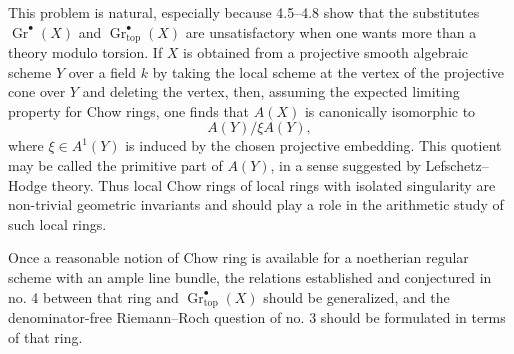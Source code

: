 \documentclass[12pt]{article}
\newcommand{\Gr}{\operatorname{Gr}}
\newcommand{\topf}{\mathrm{top}}
\begin{document}
This problem is natural, especially because 4.5--4.8 show that the substitutes $\Gr^\bullet(X)$ and $\Gr^\bullet_{\topf}(X)$ are unsatisfactory when one wants more than a theory modulo torsion. If $X$ is obtained from a projective smooth algebraic scheme $Y$ over a field $k$ by taking the local scheme at the vertex of the projective cone over $Y$ and deleting the vertex, then, assuming the expected limiting property for Chow rings, one finds that $A(X)$ is canonically isomorphic to
\[
A(Y)/\xi A(Y),
\]
where $\xi\in A^1(Y)$ is induced by the chosen projective embedding. This quotient may be called the primitive part of $A(Y)$, in a sense suggested by Lefschetz--Hodge theory. Thus local Chow rings of local rings with isolated singularity are non-trivial geometric invariants and should play a role in the arithmetic study of such local rings.

Once a reasonable notion of Chow ring is available for a noetherian regular scheme with an ample line bundle, the relations established and conjectured in no. 4 between that ring and $\Gr^\bullet_{\topf}(X)$ should be generalized, and the denominator-free Riemann--Roch question of no. 3 should be formulated in terms of that ring.
\end{document}
